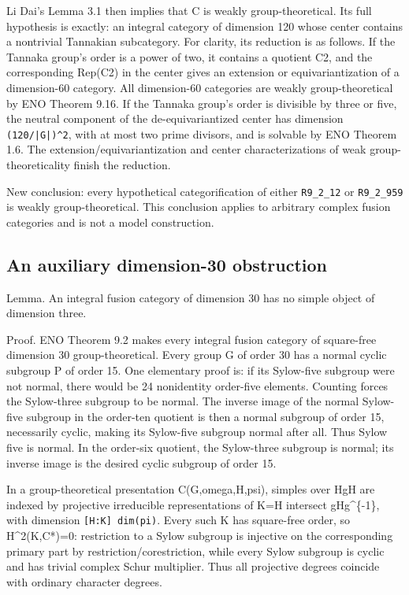 Li Dai's Lemma 3.1 then implies that C is weakly group-theoretical. Its
full hypothesis is exactly: an integral category of dimension 120 whose
center contains a nontrivial Tannakian subcategory. For clarity, its
reduction is as follows. If the Tannaka group's order is a power of two,
it contains a quotient C2, and the corresponding Rep(C2) in the center
gives an extension or equivariantization of a dimension-60 category. All
dimension-60 categories are weakly group-theoretical by ENO Theorem
9.16. If the Tannaka group's order is divisible by three or five, the
neutral component of the de-equivariantized center has dimension
\texttt{(120/\allowbreak{}|G|)\textasciicircum{}2\allowbreak{}}, with at
most two prime divisors, and is solvable by ENO Theorem 1.6. The
extension/equivariantization and center characterizations of weak
group-theoreticality finish the reduction.

New conclusion: every hypothetical categorification of either
\texttt{R9\_\allowbreak{}2\_\allowbreak{}12} or
\texttt{R9\_\allowbreak{}2\_\allowbreak{}959} is weakly
group-theoretical. This conclusion applies to arbitrary complex fusion
categories and is not a model construction.

\hypertarget{an-auxiliary-dimension-30-obstruction}{%
\subsection{An auxiliary dimension-30
obstruction}\label{an-auxiliary-dimension-30-obstruction}}

Lemma. An integral fusion category of dimension 30 has no simple object
of dimension three.

Proof. ENO Theorem 9.2 makes every integral fusion category of
square-free dimension 30 group-theoretical. Every group G of order 30
has a normal cyclic subgroup P of order 15. One elementary proof is: if
its Sylow-five subgroup were not normal, there would be 24 nonidentity
order-five elements. Counting forces the Sylow-three subgroup to be
normal. The inverse image of the normal Sylow-five subgroup in the
order-ten quotient is then a normal subgroup of order 15, necessarily
cyclic, making its Sylow-five subgroup normal after all. Thus Sylow five
is normal. In the order-six quotient, the Sylow-three subgroup is
normal; its inverse image is the desired cyclic subgroup of order 15.

In a group-theoretical presentation C(G,omega,H,psi), simples over HgH
are indexed by projective irreducible representations of K=H intersect
gHg\^{}\{-1\}, with dimension
\texttt{[H:K] \allowbreak{}dim(pi\allowbreak{})}. Every such K has
square-free order, so H\^{}2(K,C*)=0: restriction to a Sylow subgroup is
injective on the corresponding primary part by
restriction/corestriction, while every Sylow subgroup is cyclic and has
trivial complex Schur multiplier. Thus all projective degrees coincide
with ordinary character degrees.

